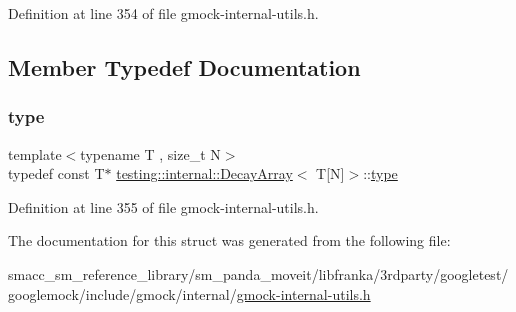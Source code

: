 Definition at line 354 of file gmock-\/internal-\/utils.\+h.



\subsection{Member Typedef Documentation}
\mbox{\label{structtesting_1_1internal_1_1DecayArray_3_01T[N]_4_afc22a88da484b94639501c07fb90bfd3}} 
\subsubsection{\texorpdfstring{type}{type}}
{\footnotesize\ttfamily template$<$typename T , size\+\_\+t N$>$ \\
typedef const T$\ast$ \hyperlink{structtesting_1_1internal_1_1DecayArray}{testing\+::internal\+::\+Decay\+Array}$<$ T\mbox{[}N\mbox{]}$>$\+::\hyperlink{structtesting_1_1internal_1_1DecayArray_3_01T[N]_4_afc22a88da484b94639501c07fb90bfd3}{type}}



Definition at line 355 of file gmock-\/internal-\/utils.\+h.



The documentation for this struct was generated from the following file\+:\begin{DoxyCompactItemize}
\item 
smacc\+\_\+sm\+\_\+reference\+\_\+library/sm\+\_\+panda\+\_\+moveit/libfranka/3rdparty/googletest/googlemock/include/gmock/internal/\hyperlink{gmock-internal-utils_8h}{gmock-\/internal-\/utils.\+h}\end{DoxyCompactItemize}
